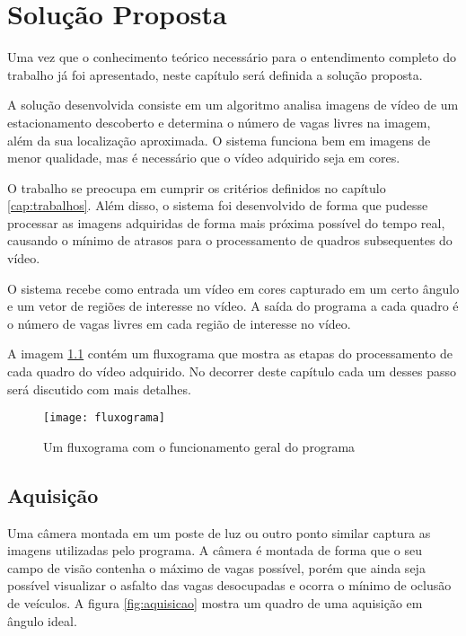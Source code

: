 \chapter{Solução Proposta}\label{cap:solucao}

Uma vez que o conhecimento teórico necessário para o entendimento completo do trabalho já foi apresentado, neste capítulo será definida a solução proposta.

A solução desenvolvida consiste em um algoritmo analisa imagens de vídeo de um estacionamento descoberto e determina o número de vagas livres na imagem, além da sua localização aproximada. O sistema funciona bem em imagens de menor qualidade, mas é necessário que o vídeo adquirido seja em cores.

O trabalho se preocupa em cumprir os critérios definidos no capítulo \ref{cap:trabalhos}. Além disso, o sistema foi desenvolvido de forma que pudesse processar as imagens adquiridas de forma mais próxima possível do tempo real, causando o mínimo de atrasos para o processamento de quadros subsequentes do vídeo.

O sistema recebe como entrada um vídeo em cores capturado em um certo ângulo e um vetor de regiões de interesse no vídeo. A saída do programa a cada quadro é o número de vagas livres em cada região de interesse no vídeo.

A imagem \ref{fig:fluxograma} contém um fluxograma que mostra as etapas do processamento de cada quadro do vídeo adquirido. No decorrer deste capítulo cada um desses passo será discutido com mais detalhes.

\begin{figure}
	\centering
	\texttt{[image: fluxograma]}
	\label{fig:fluxograma}
	\caption{Um fluxograma com o funcionamento geral do programa}
	\centering
\end{figure}



\section{Aquisição}\label{sec:aquisicao}

Uma câmera montada em um poste de luz ou outro ponto similar captura as imagens utilizadas pelo programa. A câmera é montada de forma que o seu campo de visão contenha o máximo de vagas possível, porém que ainda seja possível visualizar o asfalto das vagas desocupadas e ocorra o mínimo de oclusão de veículos. A figura \ref{fig:aquisicao} mostra um quadro de uma aquisição em ângulo ideal.

